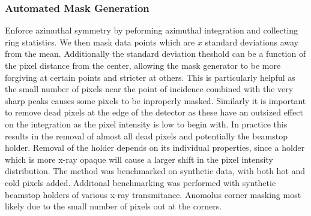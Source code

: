 \subsubsection{Automated Mask Generation}
Enforce azimuthal symmetry by peforming azimuthal integration and collecting ring statistics.  
We then mask data points which are $x$ standard deviations away from the mean.
Additionally the standard deviation theshold can be a function of the pixel distance from the center, allowing the mask generator to be more forgiving at certain points and stricter at others.
This is particularly helpful as the small number of pixels near the point of incidence combined with the very sharp peaks causes some pixels to be inproperly masked.
Similarly it is important to remove dead pixels at the edge of the detector as these have an outsized effect on the integration as the pixel intensity is low to begin with.
In practice this results in the removal of almost all dead pixels and potentially the beamstop holder.
Removal of the holder depends on its individual properties, since a holder which is more x-ray opaque will cause a larger shift in the pixel intensity distribution.
The method was benchmarked on synthetic data, with both hot and cold pixels added.
Additonal benchmarking was performed with synthetic beamstop holders of various x-ray transmitance.
Anomolus corner masking most likely due to the small number of pixels out at the corners.
